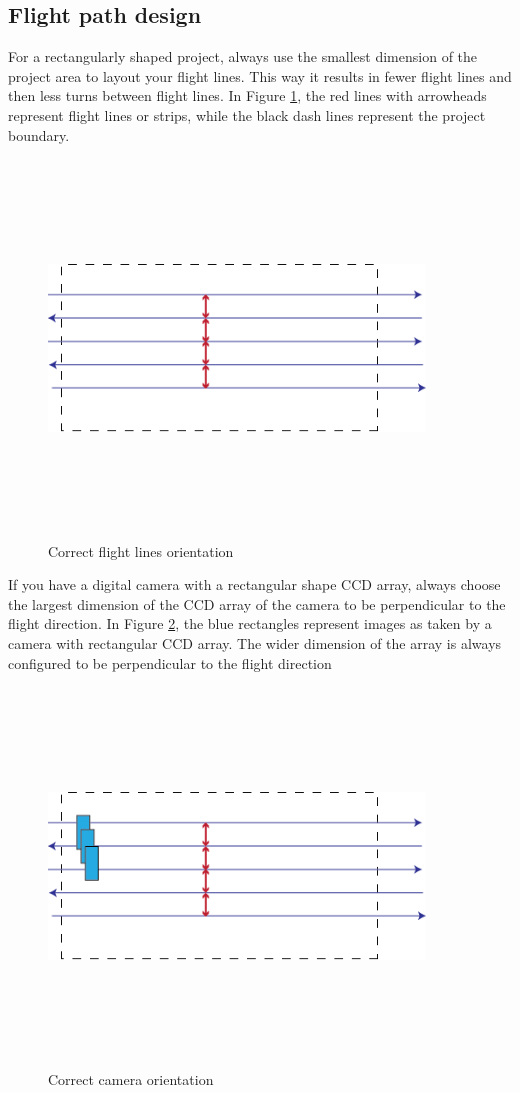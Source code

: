 \subsection{Flight path design}
For a rectangularly shaped project, always use the smallest dimension of the project area to layout your flight lines. This way it results in fewer flight lines and then less turns between flight lines. In Figure \ref{fig:line_orientaion}, the red lines with arrowheads represent flight lines or strips, while the black dash lines represent the project boundary.
\begin{figure}[H]
\centering
\includegraphics[width=10cm,height=10cm,keepaspectratio]{imagenes/Fligth_path.png}
\caption{Correct flight lines orientation}
\label{fig:line_orientaion}
\end{figure}
If you have a digital camera with a rectangular shape CCD array, always choose the largest dimension of the CCD array of the camera to be perpendicular to the flight direction. In Figure \ref{fig:camera_orientaion}, the blue rectangles represent images as taken by a camera with rectangular CCD array. The wider dimension of the array is always configured to be perpendicular to the flight direction\cite{GCP}
\begin{figure}[H]
\centering
\includegraphics[width=10cm,height=10cm,keepaspectratio]{imagenes/Camera_Orientation.png}
\caption{Correct camera orientation}
\label{fig:camera_orientaion}
\end{figure}
